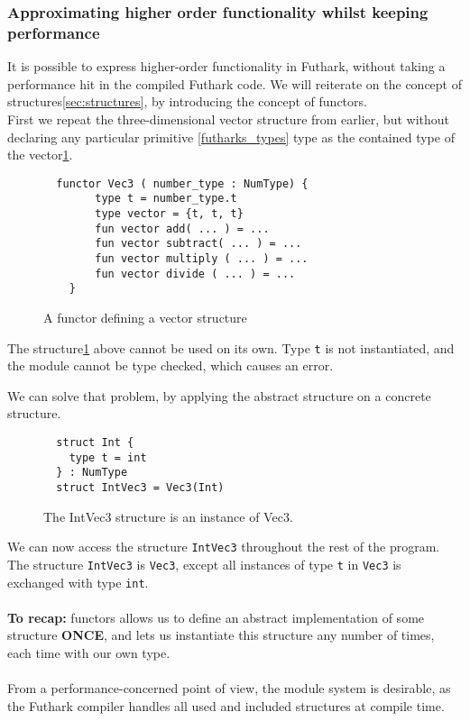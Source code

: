 \subsubsection{Approximating higher order functionality whilst keeping performance}
\label{subsec:higherorderfunctionality}
It is possible to express higher-order functionality in Futhark, without taking
a performance hit in the compiled Futhark code.
We will reiterate on the concept of structures\ref{sec:structures}, by introducing
the concept of functors.\\
First we repeat the three-dimensional vector structure
from earlier, but without declaring any particular
primitive \ref{futharks_types} type as the contained type of the vector\ref{struct_vec3}.
\begin{figure}
  \begin{verbatim}
  functor Vec3 ( number_type : NumType) { 
        type t = number_type.t
        type vector = {t, t, t}
        fun vector add( ... ) = ...
        fun vector subtract( ... ) = ...
        fun vector multiply ( ... ) = ...
        fun vector divide ( ... ) = ...
    }
  \end{verbatim}
  \caption{A functor defining a vector structure \label{struct_vec3}}
\end{figure}
\noindent
The structure\ref{struct_vec3} above cannot be used on its own. Type \texttt{t} is not
instantiated, and the module cannot be type checked, which causes an error.

\noindent
We can solve that problem, by applying the abstract structure on a concrete
structure.

\begin{figure}

\begin{verbatim}
  struct Int {
    type t = int 
  } : NumType
  struct IntVec3 = Vec3(Int)
\end{verbatim}
\caption{The IntVec3 structure is an instance of Vec3. \label{first_functor_example}}

\end{figure}
\noindent
We can now access the structure \texttt{IntVec3} throughout the rest of the
program.
\\
The structure \texttt{IntVec3} is \texttt{Vec3}, except all instances
of type \texttt{t} in \texttt{Vec3} is exchanged with type \texttt{int}.
\\
\\
\textbf{To recap:} functors allows us to define an abstract implementation of some
structure \textbf{ONCE}, and lets us instantiate this structure any number of
times, each time with our own type.
\\
\\
From a performance-concerned point of view, the module system is desirable, as the Futhark compiler handles all used and included structures at compile time.
